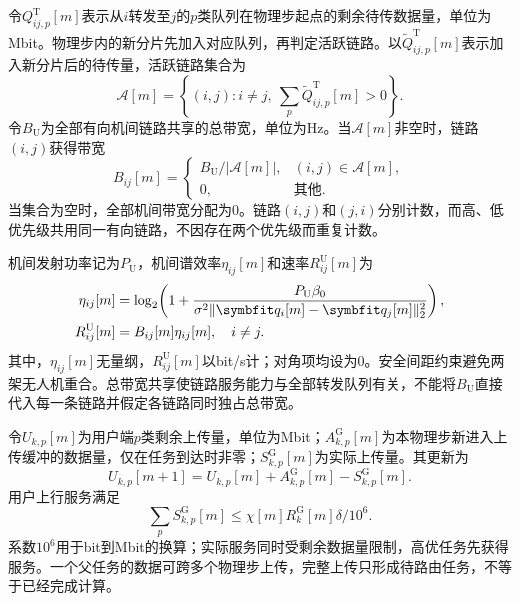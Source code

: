 令$Q_{ij,p}^{\mathrm T}[m]$表示从$i$转发至$j$的$p$类队列在物理步起点的剩余待传数据量，单位为Mbit。物理步内的新分片先加入对应队列，再判定活跃链路。以$\widetilde Q_{ij,p}^{\mathrm T}[m]$表示加入新分片后的待传量，活跃链路集合为
\begin{equation}
 \mathcal A[m]=\left\{(i,j):i\ne j,\ 
 \sum_p\widetilde Q_{ij,p}^{\mathrm T}[m]>0\right\}.
 \label{eq:active}
\end{equation}
令$B_{\mathrm U}$为全部有向机间链路共享的总带宽，单位为Hz。当$\mathcal A[m]$非空时，链路$(i,j)$获得带宽
\begin{equation}
 B_{ij}[m]=
 \begin{cases}
 B_{\mathrm U}/|\mathcal A[m]|,&(i,j)\in\mathcal A[m],\\
 0,&\text{其他}.
 \end{cases}
 \label{eq:bandwidth}
\end{equation}
当集合为空时，全部机间带宽分配为0。链路$(i,j)$和$(j,i)$分别计数，而高、低优先级共用同一有向链路，不因存在两个优先级而重复计数。

机间发射功率记为$P_{\mathrm U}$，机间谱效率$\eta_{ij}[m]$和速率$R_{ij}^{\mathrm U}[m]$为
\begin{equation}
 \begin{aligned}
 \eta_{ij}[m]&=\log_2\!\left(1+
 \frac{P_{\mathrm U}\beta_0}
 {\sigma^2\|\vct q_i[m]-\vct q_j[m]\|_2^2}\right),\\
 R_{ij}^{\mathrm U}[m]&=B_{ij}[m]\eta_{ij}[m],\quad i\ne j.
 \end{aligned}
 \label{eq:u2u}
\end{equation}
其中，$\eta_{ij}[m]$无量纲，$R_{ij}^{\mathrm U}[m]$以bit/s计；对角项均设为0。安全间距约束避免两架无人机重合。总带宽共享使链路服务能力与全部转发队列有关，不能将$B_{\mathrm U}$直接代入每一条链路并假定各链路同时独占总带宽。

令$U_{k,p}[m]$为用户端$p$类剩余上传量，单位为Mbit；$A^{\mathrm G}_{k,p}[m]$为本物理步新进入上传缓冲的数据量，仅在任务到达时非零；$S^{\mathrm G}_{k,p}[m]$为实际上传量。其更新为
\begin{equation}
 U_{k,p}[m+1]=U_{k,p}[m]+A^{\mathrm G}_{k,p}[m]
 -S^{\mathrm G}_{k,p}[m].
 \label{eq:uploadqueue}
\end{equation}
用户上行服务满足
\begin{equation}
 \sum_p S^{\mathrm G}_{k,p}[m]
 \le \chi[m]R_k^{\mathrm G}[m]\delta/10^6.
 \label{eq:uploadcap}
\end{equation}
系数$10^6$用于bit到Mbit的换算；实际服务同时受剩余数据量限制，高优任务先获得服务。一个父任务的数据可跨多个物理步上传，完整上传只形成待路由任务，不等于已经完成计算。

